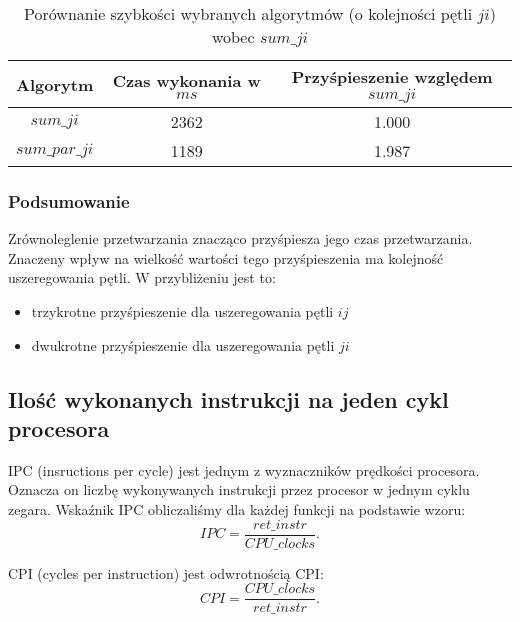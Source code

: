 \begin{table}[!ht]
\caption{Porównanie szybkości wybranych algorytmów (o kolejności pętli $ji$) wobec $sum\_ji$}
\begin{tabular}{|c|c|c|}

\hline
  Algorytm &
  Czas wykonania w $ms$ &
  Przyśpieszenie względem $sum\_ji$ \\

\hline
  $sum\_ji$ &
  2362 &
  1.000 \\

\hline
  $sum\_par\_ji$ &
  1189 &
  1.987 \\

\hline

\end{tabular}
\end{table}

\subsubsection{Podsumowanie}

Zrównoleglenie przetwarzania znacząco przyśpiesza jego czas przetwarzania. Znaczeny wpływ na wielkość wartości tego przyśpieszenia ma kolejność uszeregowania pętli. W przybliżeniu jest to:
\begin{itemize}
\item trzykrotne przyśpieszenie dla uszeregowania pętli $ij$
\item dwukrotne przyśpieszenie dla uszeregowania pętli $ji$
\end{itemize}

\subsection{Ilość wykonanych instrukcji na jeden cykl procesora}

IPC (insructions per cycle) jest jednym z wyznaczników prędkości procesora. Oznacza on liczbę wykonywanych instrukcji przez procesor w jednym cyklu zegara. Wskaźnik IPC obliczaliśmy dla każdej funkcji na podstawie wzoru:
\begin{equation}
  IPC = \frac{ret\_instr}{CPU\_clocks}.
\end{equation}

CPI (cycles per instruction) jest odwrotnością CPI:
\begin{equation}
  CPI = \frac{CPU\_clocks}{ret\_instr}.
\end{equation}

